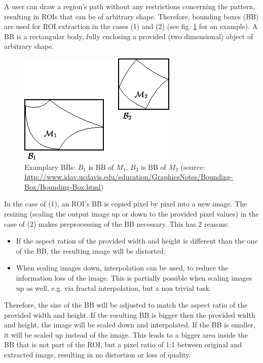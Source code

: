 A user can draw a region's path without any restrictions concerning the pattern, resulting in ROIs that can be of arbitrary shape. Therefore, bounding boxes (BB) are used for ROI extraction in the cases (1) and (2) (see fig. \ref{fig5_bbExample} for an example). A BB is a rectangular body, fully enclosing a provided (two dimensional) object of arbitrary shape\cite{Toussaint83}.

\begin{figure}[H]
	\begin{center}
		\includegraphics[scale=0.6]{img/bb1.png}
		\caption{Examplary BBs: $B_1$ is BB of $M_1$, $B_2$ is BB of $M_2$ (source: \url{http://www.idav.ucdavis.edu/education/GraphicsNotes/Bounding-Box/Bounding-Box.html})}
		\label{fig5_bbExample}
	\end{center}
\end{figure}

In the case of (1), an ROI's BB is copied pixel by pixel into a new image. The resizing (scaling the output image up or down to the provided pixel values) in the case of (2) makes preprocessing of the BB necessary. This has 2 reasons:
\begin{itemize}
	\item If the aspect ration of the provided width and height is different than the one of the BB, the resulting image will be distorted.
	\item When scaling images down, interpolation can be used, to reduce the information loss of the image\cite{Thevanez00}. This is partially possible when scaling images up as well, e.g. via fractal interpolation, but a non trivial task\cite{Guerdri16}.
\end{itemize}

Therefore, the size of the BB will be adjusted to match the aspect ratio of the provided width and height. If the resulting BB is bigger then the provided width and height, the image will be scaled down and interpolated. If the BB is smaller, it will be scaled up instead of the image. This leads to a bigger area inside the BB that is not part of the ROI, but a pixel ratio of 1:1 between original and extracted image, resulting in no distortion or loss of quality.

